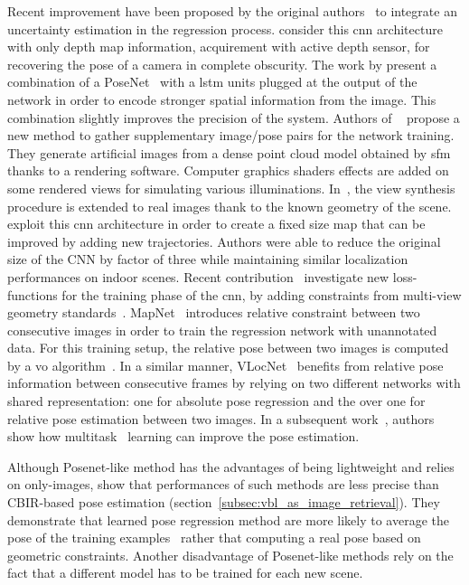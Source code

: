 Recent improvement have been proposed by the original authors~\citep{Kendall2016} to integrate an uncertainty estimation in the regression process. \citet{Liu2016} consider this \ac{cnn} architecture with only depth map information, acquirement with active depth sensor, for recovering the pose of a camera in complete obscurity. The work by \citet{Walch2016a} present a combination of a PoseNet~\citep{Kendall2015} with a \ac{lstm} units plugged at the output of the network in order to encode stronger spatial information from the image. This combination slightly improves the precision of the system. Authors of ~\citep{Jia2016} propose a new method to gather supplementary image/pose pairs for the network training. They generate artificial images from a dense point cloud model obtained by \ac{sfm} thanks to a rendering software. Computer graphics shaders effects are added on some rendered views for simulating various illuminations. In~\citep{Purkait2018}, the view synthesis procedure is extended to real images thank to the known geometry of the scene. \citet{Contreras2017} exploit this \ac{cnn} architecture in order to create a fixed size map that can be improved by adding new trajectories. Authors were able to reduce the original size of the CNN by factor of three while maintaining similar localization performances on indoor scenes. Recent contribution~\citep{Kendall2017} investigate new loss-functions for the training phase of the \ac{cnn}, by adding constraints from multi-view geometry standards~\citep{Hartley2003}. MapNet~\citep{Brahmbhatt2017a} introduces relative constraint between two consecutive images in order to train the regression network with unannotated data. For this training setup, the relative pose between two images is computed by a \ac{vo} algorithm~\citep{engel2017direct,forster2016svo}. In a similar manner, VLocNet~\citep{Valada2018} benefits from relative pose information between consecutive frames by relying on two different networks with shared representation: one for absolute pose regression and the over one for relative pose estimation between two images. In a subsequent work~\citep{Radwan2018,Valada}, authors show how multitask~\citep{kokkinos2017ubernet,Kendall2017a,Zamir2018} learning can improve the pose estimation.

Although Posenet-like method has the advantages of being lightweight and relies on only-images, \citet{Sattler2019} show that performances of such methods are less precise than CBIR-based pose estimation (section~\ref{subsec:vbl_as_image_retrieval}). They demonstrate that learned pose regression method are more likely to average the pose of the training examples~\citep{Torii2013} rather that computing a real pose based on geometric constraints. Another disadvantage of Posenet-like methods rely on the fact that a different model has to be trained for each new scene.

